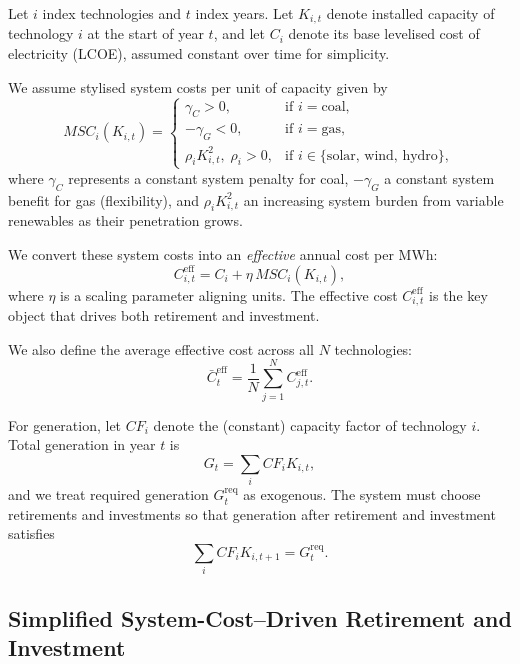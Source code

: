 \documentclass[preprint,authoryear,12pt]{elsarticle}
\begin{document}
Let $i$ index technologies and $t$ index years. Let $K_{i,t}$ denote installed capacity of technology
$i$ at the start of year $t$, and let $C_i$ denote its base levelised cost of electricity (LCOE),
assumed constant over time for simplicity.

We assume stylised system costs per unit of capacity given by
\begin{equation}
    MSC_i(K_{i,t})
    =
    \begin{cases}
        \gamma_C > 0,                        & \text{if } i = \text{coal}, \\[4pt]
        -\gamma_G < 0,                       & \text{if } i = \text{gas},  \\[4pt]
        \rho_i K_{i,t}^2, \;\rho_i > 0,      & \text{if } i \in \{\text{solar, wind, hydro}\},
    \end{cases}
    \label{eq:D_MSCs_opt}
\end{equation}
where $\gamma_C$ represents a constant system penalty for coal, $-\gamma_G$ a constant system
benefit for gas (flexibility), and $\rho_i K_{i,t}^2$ an increasing system burden from variable
renewables as their penetration grows.

We convert these system costs into an \emph{effective} annual cost per MWh:
\begin{equation}
    C_{i,t}^{\mathrm{eff}}
    = C_i + \eta \, MSC_i(K_{i,t}),
    \label{eq:D_Ceff_opt}
\end{equation}
where $\eta$ is a scaling parameter aligning units. The effective cost
$C_{i,t}^{\mathrm{eff}}$ is the key object that drives both retirement and investment.

We also define the average effective cost across all $N$ technologies:
\begin{equation}
    \bar{C}_t^{\mathrm{eff}}
    = \frac{1}{N} \sum_{j=1}^N C_{j,t}^{\mathrm{eff}}.
    \label{eq:D_Cbar_opt}
\end{equation}

For generation, let $CF_i$ denote the (constant) capacity factor of technology $i$. Total
generation in year $t$ is
\[
    G_t = \sum_i CF_i K_{i,t},
\]
and we treat required generation $G_t^{\mathrm{req}}$ as exogenous. The system must choose
retirements and investments so that generation after retirement and investment satisfies
\[
    \sum_i CF_i K_{i,t+1} = G_t^{\mathrm{req}}.
\]


\subsection{Simplified System-Cost–Driven Retirement and Investment}
\end{document}
